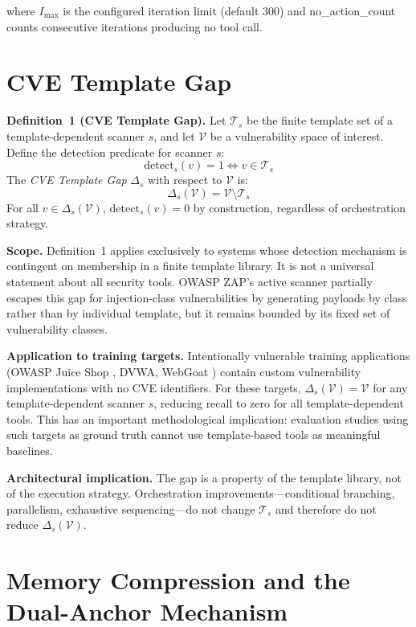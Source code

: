 \documentclass[12pt, a4paper, oneside, openany]{book}
\begin{document}
where $I_{\max}$ is the configured iteration limit (default 300) and
no\_action\_count counts consecutive iterations producing no tool call.

\section{CVE Template Gap}
\label{sec:formal_cvegap}

\begin{infobox}
\textbf{Definition~1 (CVE Template Gap).}
Let $\mathcal{T}_s$ be the finite template set of a
template-dependent scanner $s$, and let $\mathcal{V}$ be a
vulnerability space of interest.  Define the detection predicate for
scanner $s$:
\[
  \mathrm{detect}_s(v) = 1 \iff v \in \mathcal{T}_s
\]
The \emph{CVE Template Gap} $\Delta_s$ with respect to $\mathcal{V}$
is:
\[
  \Delta_s(\mathcal{V}) = \mathcal{V} \setminus \mathcal{T}_s
\]
For all $v \in \Delta_s(\mathcal{V})$, $\mathrm{detect}_s(v) = 0$ by
construction, regardless of orchestration strategy.
\end{infobox}

\textbf{Scope.}  Definition~1 applies exclusively to systems whose
detection mechanism is contingent on membership in a finite template
library.  It is not a universal statement about all security tools.
OWASP ZAP's active scanner partially escapes this gap for
injection-class vulnerabilities by generating payloads by class
rather than by individual template, but it remains bounded by its
fixed set of vulnerability classes.

\textbf{Application to training targets.}  Intentionally vulnerable
training applications (OWASP Juice Shop \citep{owasp_juiceshop},
DVWA, WebGoat \citep{owasp_webgoat}) contain custom vulnerability
implementations with no CVE identifiers.  For these targets,
$\Delta_s(\mathcal{V}) = \mathcal{V}$ for any template-dependent
scanner $s$, reducing recall to zero for all template-dependent
tools.  This has an important methodological implication: evaluation
studies using such targets as ground truth cannot use
template-based tools as meaningful baselines.

\textbf{Architectural implication.}  The gap is a property of the
template library, not of the execution strategy.  Orchestration
improvements---conditional branching, parallelism, exhaustive
sequencing---do not change $\mathcal{T}_s$ and therefore do not
reduce $\Delta_s(\mathcal{V})$.

\section{Memory Compression and the Dual-Anchor Mechanism}
\label{sec:formal_memory}
\end{document}
